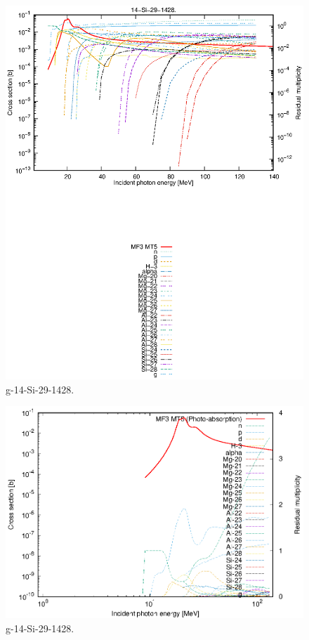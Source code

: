 \begin{figure}
 \includegraphics[width=\linewidth]{eps/g_14-Si-29_1428.eps}
  \caption{g-14-Si-29-1428.}
\end{figure}
\newpage \clearpage

\begin{figure}
 \includegraphics[width=\linewidth]{eps-log/g_14-Si-29_1428.eps}
 \caption{g-14-Si-29-1428.}
\end{figure}
\newpage \clearpage

